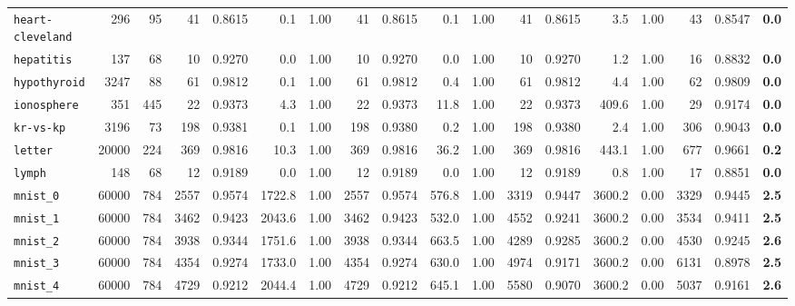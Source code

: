 \begin{tabular}{lccrrrrrrrrrrrrrrr}
\texttt{heart-cleveland} & \multicolumn{1}{r}{296} & \multicolumn{1}{r}{95}  & 41 & 0.8615 & 0.1 & 1.00 & 41 & 0.8615 & 0.1 & 1.00 & 41 & 0.8615 & 3.5 & 1.00 & 43 & 0.8547 & \textbf{0.0}\\
\texttt{hepatitis} & \multicolumn{1}{r}{137} & \multicolumn{1}{r}{68}  & 10 & 0.9270 & 0.0 & 1.00 & 10 & 0.9270 & 0.0 & 1.00 & 10 & 0.9270 & 1.2 & 1.00 & 16 & 0.8832 & \textbf{0.0}\\
\texttt{hypothyroid} & \multicolumn{1}{r}{3247} & \multicolumn{1}{r}{88}  & 61 & 0.9812 & 0.1 & 1.00 & 61 & 0.9812 & 0.4 & 1.00 & 61 & 0.9812 & 4.4 & 1.00 & 62 & 0.9809 & \textbf{0.0}\\
\texttt{ionosphere} & \multicolumn{1}{r}{351} & \multicolumn{1}{r}{445}  & 22 & 0.9373 & 4.3 & 1.00 & 22 & 0.9373 & 11.8 & 1.00 & 22 & 0.9373 & 409.6 & 1.00 & 29 & 0.9174 & \textbf{0.0}\\
\texttt{kr-vs-kp} & \multicolumn{1}{r}{3196} & \multicolumn{1}{r}{73}  & 198 & 0.9381 & 0.1 & 1.00 & 198 & 0.9380 & 0.2 & 1.00 & 198 & 0.9380 & 2.4 & 1.00 & 306 & 0.9043 & \textbf{0.0}\\
\texttt{letter} & \multicolumn{1}{r}{20000} & \multicolumn{1}{r}{224}  & 369 & 0.9816 & 10.3 & 1.00 & 369 & 0.9816 & 36.2 & 1.00 & 369 & 0.9816 & 443.1 & 1.00 & 677 & 0.9661 & \textbf{0.2}\\
\texttt{lymph} & \multicolumn{1}{r}{148} & \multicolumn{1}{r}{68}  & 12 & 0.9189 & 0.0 & 1.00 & 12 & 0.9189 & 0.0 & 1.00 & 12 & 0.9189 & 0.8 & 1.00 & 17 & 0.8851 & \textbf{0.0}\\
\texttt{mnist\_0} & \multicolumn{1}{r}{60000} & \multicolumn{1}{r}{784}  & 2557 & 0.9574 & 1722.8 & 1.00 & 2557 & 0.9574 & 576.8 & 1.00 & 3319 & 0.9447 & 3600.2 & 0.00 & 3329 & 0.9445 & \textbf{2.5}\\
\texttt{mnist\_1} & \multicolumn{1}{r}{60000} & \multicolumn{1}{r}{784}  & 3462 & 0.9423 & 2043.6 & 1.00 & 3462 & 0.9423 & 532.0 & 1.00 & 4552 & 0.9241 & 3600.2 & 0.00 & 3534 & 0.9411 & \textbf{2.5}\\
\texttt{mnist\_2} & \multicolumn{1}{r}{60000} & \multicolumn{1}{r}{784}  & 3938 & 0.9344 & 1751.6 & 1.00 & 3938 & 0.9344 & 663.5 & 1.00 & 4289 & 0.9285 & 3600.2 & 0.00 & 4530 & 0.9245 & \textbf{2.6}\\
\texttt{mnist\_3} & \multicolumn{1}{r}{60000} & \multicolumn{1}{r}{784}  & 4354 & 0.9274 & 1733.0 & 1.00 & 4354 & 0.9274 & 630.0 & 1.00 & 4974 & 0.9171 & 3600.2 & 0.00 & 6131 & 0.8978 & \textbf{2.5}\\
\texttt{mnist\_4} & \multicolumn{1}{r}{60000} & \multicolumn{1}{r}{784}  & 4729 & 0.9212 & 2044.4 & 1.00 & 4729 & 0.9212 & 645.1 & 1.00 & 5580 & 0.9070 & 3600.2 & 0.00 & 5037 & 0.9161 & \textbf{2.6}\\

\end{tabular}
